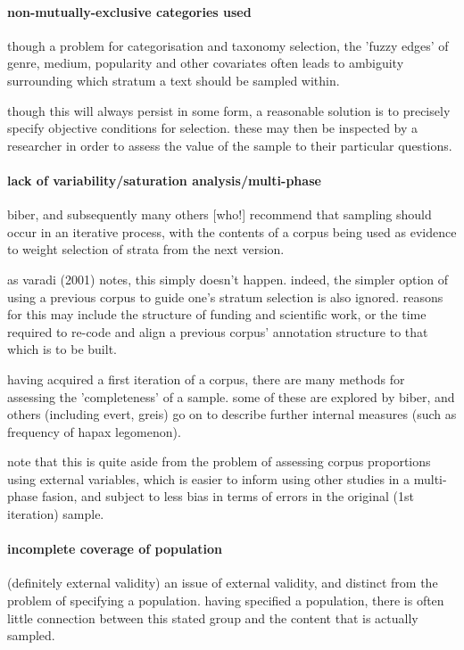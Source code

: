 \paragraph{ non-mutually-exclusive categories used}
though a problem for categorisation and taxonomy selection, the 'fuzzy edges' of genre, medium, popularity and other covariates often leads to ambiguity surrounding which stratum a text should be sampled within.

though this will always persist in some form, a reasonable solution is to precisely specify objective conditions for selection.  these may then be inspected by a researcher in order to assess the value of the sample to their particular questions.


\paragraph{ lack of variability/saturation analysis/multi-phase}
biber, and subsequently many others [who!] recommend that sampling should occur in an iterative process, with the contents of a corpus being used as evidence to weight selection of strata from the next version.

as varadi (2001) notes, this simply doesn't happen.  indeed, the simpler option of using a previous corpus to guide one's stratum selection is also ignored.  reasons for this may include the structure of funding and scientific work, or the time required to re-code and align a previous corpus' annotation structure to that which is to be built.  

having acquired a first iteration of a corpus, there are many methods for assessing the 'completeness' of a sample.  some of these are explored by biber, and others (including evert, greis) go on to describe further internal measures (such as frequency of hapax legomenon).

note that this is quite aside from the problem of assessing corpus proportions using external variables, which is easier to inform using other studies in a multi-phase fasion, and subject to less bias in terms of errors in the original (1st iteration) sample.


\paragraph{ incomplete coverage of population }
(definitely external validity)
an issue of external validity, and distinct from the problem of specifying a population.  having specified a population, there is often little connection between this stated group and the content that is actually sampled.

